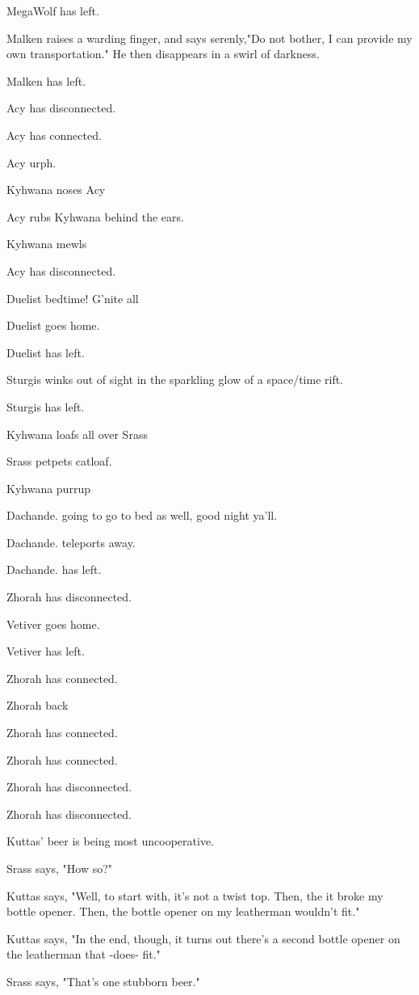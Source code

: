 MegaWolf has left.

Malken raises a warding finger, and says serenly,"Do not bother, I can provide my own transportation."  He then disappears in a swirl of darkness.

Malken has left.

Acy has disconnected.

Acy has connected.

Acy urph.

Kyhwana noses Acy

Acy rubs Kyhwana behind the ears.

Kyhwana mewls

Acy has disconnected.

Duelist bedtime! G'nite all

Duelist goes home.

Duelist has left.

Sturgis winks out of sight in the sparkling glow of a space/time rift.

Sturgis has left.

Kyhwana loafs all over Srass

Srass petpets catloaf.

Kyhwana purrup

Dachande. going to go to bed as well, good night ya'll.

Dachande. teleports away.

Dachande. has left.

Zhorah has disconnected.

Vetiver goes home.

Vetiver has left.

Zhorah has connected.

Zhorah back

Zhorah has connected.

Zhorah has connected.

Zhorah has disconnected.

Zhorah has disconnected.

Kuttas' beer is being most uncooperative.

Srass says, "How so?"

Kuttas says, "Well, to start with, it's not a twist top. Then, the it broke my bottle opener. Then, the bottle opener on my leatherman wouldn't fit."

Kuttas says, "In the end, though, it turns out there's a second bottle opener on the leatherman that -does- fit."

Srass says, "That's one stubborn beer."

